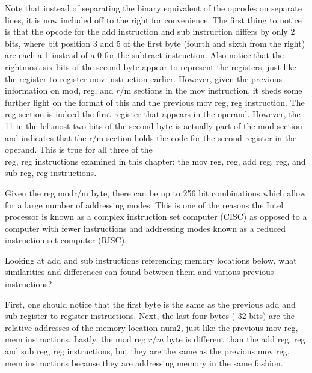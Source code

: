 \documentclass[10pt]{article}
\begin{document}
Note that instead of separating the binary equivalent of the opcodes on separate lines, it is now included off to the right for convenience. The first thing to notice is that the opcode for the add instruction and sub instruction differs by only 2 bits, where bit position 3 and 5 of the first byte (fourth and sixth from the right) are each a 1 instead of a 0 for the subtract instruction. Also notice that the rightmost six bits of the second byte appear to represent the registers, just like the register-to-register mov instruction earlier. However, given the previous information on mod, reg, and $r / \mathrm{m}$ sections in the mov instruction, it sheds some further light on the format of this and the previous mov reg, reg instruction. The reg section is indeed the first register that appears in the operand. However, the 11 in the leftmost two bits of the second byte is actually part of the mod section and indicates that the $\mathrm{r} / \mathrm{m}$ section holds the code for the second register in the operand. This is true for all three of the\\
reg, reg instructions examined in this chapter: the mov reg, reg, add reg, reg, and sub reg, reg instructions.

Given the reg modr/m byte, there can be up to 256 bit combinations which allow for a large number of addressing modes. This is one of the reasons the Intel processor is known as a complex instruction set computer (CISC) as opposed to a computer with fewer instructions and addressing modes known as a reduced instruction set computer (RISC).

Looking at add and sub instructions referencing memory locations below, what similarities and differences can found between them and various previous instructions?

First, one should notice that the first byte is the same as the previous add and sub register-to-register instructions. Next, the last four bytes ( 32 bits) are the relative addresses of the memory location num2, just like the previous mov reg, mem instructions. Lastly, the mod reg $r / m$ byte is different than the add reg, reg and sub reg, reg instructions, but they are the same as the previous mov reg, mem instructions because they are addressing memory in the same fashion.
\end{document}
